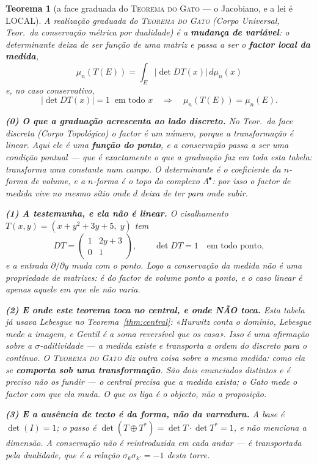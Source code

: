 \documentclass[11pt,a4paper]{article}
\newtheorem{teorema}{Teorema}
\begin{document}
\begin{teorema}[a face graduada do \textsc{Teorema do Gato} --- o
Jacobiano, e a lei é LOCAL]\label{thm:medida-jacobiano}
A realização graduada do \textsc{Teorema do Gato} (\emph{Corpo
Universal}, Teor.~da conservação métrica por dualidade) é a
\textbf{mudança de variável}: o determinante deixa de ser função de uma matriz e passa a
ser o \textbf{factor local da medida},
\[
\boxed{\;\mu_{n}(T(E))=\int_{E}|\det DT(x)|\,d\mu_{n}(x)\;}
\]
e, no caso conservativo,
\[
|\det DT(x)|=1\;\;\text{em todo }x
\quad\Longrightarrow\quad
\mu_{n}(T(E))=\mu_{n}(E).
\]

\textbf{(0) O que a graduação acrescenta ao lado discreto.} No
Teor.~da face discreta (\emph{Corpo Topológico}) o factor é \emph{um}
número, porque a transformação é linear. Aqui ele é uma \textbf{função
do ponto}, e a conservação passa a ser uma condição \emph{pontual} ---
que é exactamente o que a graduação faz em toda esta tabela: transforma
uma constante num campo. O determinante é o coeficiente da $n$-forma de
volume, e a $n$-forma é o topo do complexo $\Lambda^{\bullet}$: por isso
o factor de medida vive no mesmo sítio onde $d$ deixa de ter para onde
subir.

\textbf{(1) A testemunha, e ela não é linear.} O cisalhamento
$T(x,y)=(x+y^{2}+3y+5,\;y)$ tem
\[
DT=\begin{pmatrix} 1 & 2y+3\\ 0 & 1\end{pmatrix},
\qquad \det DT=1\quad\text{em todo ponto},
\]
e a entrada $\partial/\partial y$ \emph{muda} com o ponto. Logo a
conservação da medida não é uma propriedade de matrizes: é do factor de
volume ponto a ponto, e o caso linear é apenas aquele em que ele não
varia.

\textbf{(2) E onde este teorema toca no central, e onde NÃO toca.} Esta
tabela já usava Lebesgue no Teorema~\ref{thm:central}: «Hurwitz conta o
domínio, Lebesgue mede a imagem, e Gentil é a soma reversível que os
casa». Isso é uma afirmação sobre a $\sigma$-aditividade --- a medida
existe e transporta a ordem do discreto para o contínuo. O
\textsc{Teorema do Gato} diz outra coisa sobre a \emph{mesma} medida:
como ela se \textbf{comporta sob uma transformação}. São dois enunciados
distintos e é preciso não os fundir --- o central precisa que a medida
exista; o Gato mede o factor com que ela muda. O que os liga é o objecto,
não a proposição.

\textbf{(3) E a ausência de tecto é da forma, não da varredura.} A base
é $\det(I)=1$; o passo é
$\det(T\oplus T^{\ast})=\det T\cdot\det T^{\ast}=1$, e não menciona a
dimensão. A conservação não é reintroduzida em cada andar --- é
transportada pela dualidade, que é a relação $\sigma_{k}\sigma_{k'}=-1$
desta torre.


\end{teorema}
\end{document}
